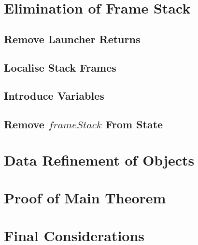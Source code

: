 

\section{Elimination of Frame Stack}
\label{elimination-of-frame-stack-section}



\subsection{Remove Launcher Returns}
\label{remove-launcher-returns-subsection}



\subsection{Localise Stack Frames}
\label{localise-stack-frames-subsection}



\subsection{Introduce Variables}
\label{introduce-variables-subsection}



\subsection{Remove \texorpdfstring{$frameStack$}{frameStack} From
  State}
\label{remove-frameStack-from-state-subsection}



\section{Data Refinement of Objects}
\label{data-refinement-of-objects-section}



\section{Proof of Main Theorem}
\label{main-theorem-proof-section}



\section{Final Considerations}
\label{compilation-final-considerations-section}

